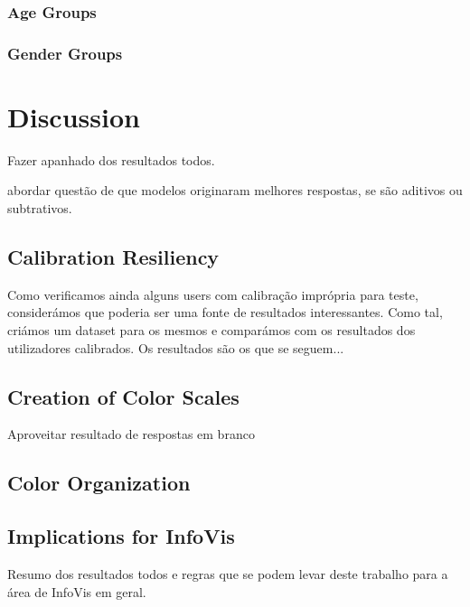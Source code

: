 \subsubsection{Age Groups}
\label{subsubsec:demo_age}
%
\subsubsection{Gender Groups}
\label{subsubsec:demo_age}
%
%
\section{Discussion}
\label{sec:results_discussion}
%
Fazer apanhado dos resultados todos. \par
abordar questão de que modelos originaram melhores respostas, se são aditivos ou subtrativos. \\
%
\subsection{Calibration Resiliency}
\label{subsec:results_calibration}
%
Como verificamos ainda alguns users com calibração imprópria para teste, considerámos que poderia ser uma fonte de resultados
interessantes. Como tal, criámos um dataset para os mesmos e comparámos com os resultados dos utilizadores calibrados. Os resultados
são os que se seguem... \par
%
\subsection{Creation of Color Scales}
\label{subsec:results_discussion_colorscales}
%
Aproveitar resultado de respostas em branco
%
\subsection{Color Organization}
\label{subsec:results_discussion_colororganization}

\subsection{Implications for InfoVis}
\label{subsec:results_discussion_infovis}
%
Resumo dos resultados todos e regras que se podem levar deste trabalho para a área de InfoVis em geral.
%
